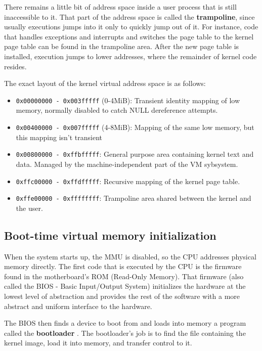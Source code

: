 \documentclass[shortabstract, english]{iithesis}
\begin{document}
There remains a little bit of address space inside a user process that is still
inaccessible to it. That part of the address space is called the
\textbf{trampoline}, since usually executions jumps into it only to quickly jump
out of it. For instance, code that handles exceptions and interrupts and
switches the page table to the kernel page table can be found in the trampoline
area. After the new page table is installed, execution jumps to lower addresses,
where the remainder of kernel code resides.

The exact layout of the kernel virtual address space is as follows:
\begin{itemize}
\item \texttt{0x00000000 - 0x003fffff} (0-4MiB): Transient identity mapping of
  low memory, normally disabled to catch NULL dereference attempts.
\item \texttt{0x00400000 - 0x007fffff} (4-8MiB): Mapping of the same low memory,
  but this mapping isn't transient
\item \texttt{0x00800000 - 0xffbfffff}: General purpose area containing kernel
  text and data. Managed by the machine-independent part of the VM sybsystem.
\item \texttt{0xffc00000 - 0xffdfffff}: Recursive mapping of the kernel page
  table.
\item \texttt{0xffe00000 - 0xffffffff}: Trampoline area shared between the
  kernel and the user.
\end{itemize}

\subsection{Boot-time virtual memory initialization}

When the system starts up, the MMU is disabled, so the CPU addresses physical
memory directly. The first code that is executed by the CPU is the firmware
found in the motherboard's ROM (Read-Only Memory). That firmware (also called
the BIOS - Basic Input/Output System) \cite[Section~15.1]{bib:mckusick14} initializes the hardware at the lowest
level of abstraction and provides the rest of the software with a more abstract
and uniform interface to the hardware.

The BIOS then finds a device to boot from and loads into memory a program called
the \textbf{bootloader} \cite[Section~15.2]{bib:mckusick14}. The bootloader's
job is to find the file containing the kernel image, load it into memory, and
transfer control to it.
\end{document}
